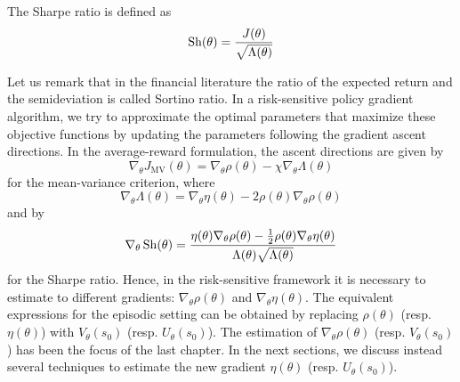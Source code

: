 \begin{definition}
	The Sharpe ratio is defined as 
	\begin{equation}
		\operatorname*{Sh}(\theta) = \frac{J(\theta)}{\sqrt{\Lambda(\theta)}}
	\end{equation}
\end{definition} 
Let us remark that in the financial literature the ratio of the expected return and the semideviation is called Sortino ratio. In a risk-sensitive policy gradient algorithm, we try to approximate the optimal parameters that maximize these objective functions by updating the parameters following the gradient ascent directions. In the average-reward formulation, the ascent directions are given by 
\begin{equation}
	\label{eq:gradient_mean_variance}
	\nabla_\theta J_{\text{MV}}(\theta) = \nabla_\theta \rho(\theta) - \chi \nabla_\theta \Lambda(\theta)
\end{equation}
for the mean-variance criterion, where 
\begin{equation}
	\nabla_\theta \Lambda(\theta) =	\nabla_\theta \eta(\theta) - 2 \rho(\theta) \nabla_\theta \rho(\theta)
\end{equation} 
and by 
\begin{equation} 
	\label{eq:gradient_sharpe_ratio}
	\nabla_\theta \operatorname*{Sh}(\theta) = \frac{\eta(\theta) \nabla_\theta \rho(\theta) - \frac{1}{2} \rho(\theta) \nabla_\theta \eta(\theta)}{\Lambda(\theta) \sqrt{\Lambda(\theta)}}
\end{equation}
for the Sharpe ratio. Hence, in the risk-sensitive framework it is necessary to estimate to different gradients: $\nabla_\theta \rho(\theta)$ and $\nabla_\theta \eta(\theta)$. The equivalent expressions for the episodic setting can be obtained by replacing $\rho(\theta)$ (resp. $\eta(\theta)$) with $V_\theta(s_0)$ (resp. $U_\theta(s_0)$). The estimation of $\nabla_\theta \rho(\theta)$ (resp. $V_\theta(s_0)$) has been the focus of the last chapter. In the next sections, we discuss instead several techniques to estimate the new gradient $\eta(\theta)$ (resp. $U_\theta(s_0)$).

